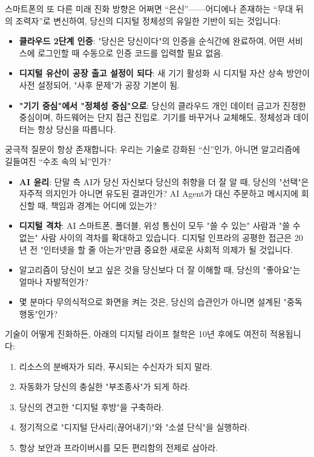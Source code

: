 
스마트폰의 또 다른 미래 진화 방향은 어쩌면 “은신”——어디에나 존재하는 “무대 뒤의 조력자”로 변신하여, 당신의 디지털 정체성의 유일한 기반이 되는 것입니다:

\begin{itemize}
  \item \textbf{클라우드 2단계 인증}: "당신은 당신이다"의 인증을 순식간에 완료하여, 어떤 서비스에 로그인할 때 수동으로 인증 코드를 입력할 필요 없음.
  \item \textbf{디지털 유산이 공장 출고 설정이 되다}: 새 기기 활성화 시 디지털 자산 상속 방안이 사전 설정되어, "사후 문제"가 공장 기본이 됨.
  \item \textbf{"기기 중심"에서 "정체성 중심"으로}: 당신의 클라우드 개인 데이터 금고가 진정한 중심이며, 하드웨어는 단지 접근 진입로. 기기를 바꾸거나 교체해도, 정체성과 데이터는 항상 당신을 따릅니다.
\end{itemize}


궁극적 질문이 항상 존재합니다: 우리는 기술로 강화된 “신”인가, 아니면 알고리즘에 길들여진 “수조 속의 뇌”인가?

\begin{itemize}
  \item \textbf{AI 윤리}: 단말 측 AI가 당신 자신보다 당신의 취향을 더 잘 알 때, 당신의 "선택"은 자주적 의지인가 아니면 유도된 결과인가? AI Agent가 대신 주문하고 메시지에 회신할 때, 책임과 경계는 어디에 있는가?
  \item \textbf{디지털 격차}: AI 스마트폰, 폴더블, 위성 통신이 모두 "쓸 수 있는" 사람과 "쓸 수 없는" 사람 사이의 격차를 확대하고 있습니다. 디지털 인프라의 공평한 접근은 20년 전 "인터넷을 할 줄 아는가"만큼 중요한 새로운 사회적 의제가 될 것입니다.
  \item 알고리즘이 당신이 보고 싶은 것을 당신보다 더 잘 이해할 때, 당신의 "좋아요"는 얼마나 자발적인가?
  \item 몇 분마다 무의식적으로 화면을 켜는 것은, 당신의 습관인가 아니면 설계된 "중독 행동"인가?
\end{itemize}


기술이 어떻게 진화하든, 아래의 디지털 라이프 철학은 10년 후에도 여전히 적용됩니다:

\begin{enumerate}
  \item 리소스의 분배자가 되라, 푸시되는 수신자가 되지 말라.
  \item 자동화가 당신의 충실한 "부조종사"가 되게 하라.
  \item 당신의 견고한 "디지털 후방"을 구축하라.
  \item 정기적으로 "디지털 단사리(끊어내기)"와 "소셜 단식"을 실행하라.
  \item 항상 보안과 프라이버시를 모든 편리함의 전제로 삼아라.
\end{enumerate}

